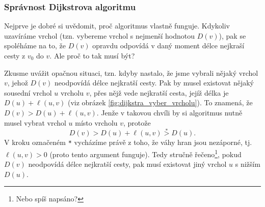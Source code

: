 \subsubsection{Správnost Dijkstrova algoritmu}

Nejprve je dobré si uvědomit, proč algoritmus vlastně funguje. Kdykoliv uzavíráme vrchol (tzn. vybereme vrchol s nejmenší hodnotou $D(v)$), pak se spoléháme na to, že $D(v)$ opravdu odpovídá v daný moment délce nejkraší cesty z $v_0$ do $v$. Ale proč to tak musí být?

Zkusme uvážit opačnou situaci, tzn. kdyby nastalo, že jsme vybrali nějaký vrchol $v$, jehož $D(v)$ neodpovídá délce nejkratší cesty. Pak by musel existovat nějaký sousední vrchol $u$ vrcholu $v$, přes nějž vede nejkratší cesta, jejíž délka je $D(u)+\ell(u,v)$ (viz obrázek \ref{fig:dijkstra_vyber_vrcholu}). To znamená, že $D(v)>D(u)+\ell(u,v)$. Jenže v takovou chvíli by si algoritmus nutně musel vybrat vrchol $u$ místo vrcholu $v$, protože
\[D(v)>D(u)+\ell(u,v)\stackrel{\texttt{*}}{>}D(u).\]
V kroku označeném \texttt{*} vycházíme právě z toho, že váhy hran jsou nezáporné, tj. $\ell(u,v)>0$ (proto tento argument funguje). Tedy stručně řečeno\footnote{Nebo spíš napsáno?}, pokud $D(v)$ neodpovídá délce nejkratší cesty, pak musí existovat jiný vrchol $u$ s nižším $D(u)$.
